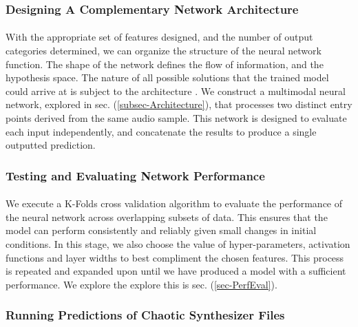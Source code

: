 \documentclass[12pt,letterpaper]{article}
\begin{document}

\subsubsection{Designing A Complementary Network Architecture}

\paragraph*{}With the appropriate set of features designed, and the number of output categories determined, we can organize the structure of the neural network function. The shape of the network defines the flow of information, and the hypothesis space. The nature of all possible solutions that the trained model could arrive at is subject to the architecture \cite{Goodfellow,Loy}. We construct a multimodal neural network, explored in sec. (\ref{subsec-Architecture}), that processes two distinct entry points derived from the same audio sample. This network is designed to evaluate each input independently, and concatenate the results to produce a single outputted prediction.


\subsubsection{Testing and Evaluating Network Performance}

\paragraph*{}We execute a K-Folds cross validation algorithm to evaluate the performance of the neural network across overlapping subsets of data. This ensures that the model can perform consistently and reliably given small changes in initial conditions. In this stage, we also choose the value of hyper-parameters, activation functions and layer widths to best compliment the chosen features. This process is repeated and expanded upon until we have produced a model with a sufficient performance. We explore the explore this is sec. (\ref{sec-PerfEval}).


\subsubsection{Running Predictions of Chaotic Synthesizer Files}
\end{document}
